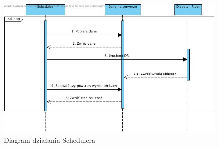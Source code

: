 \begin{center}
\begin{figure}[H]
\centering
\includegraphics[scale=0.7]{imgs/S1.jpg}
\caption{Diagram działania Schedulera}
\label{fig:tasks_list}
\end{figure}
\end{center}
